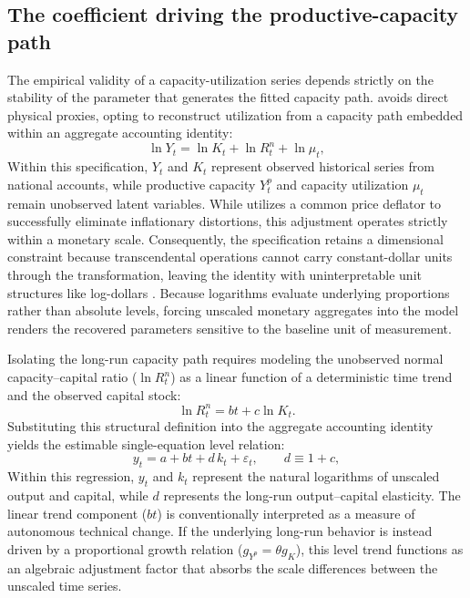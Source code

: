 \documentclass[11pt]{article}
\begin{document}
\subsection{The coefficient driving the productive-capacity path}
\label{subsec:coefficient_capacity_path}

The empirical validity of a capacity-utilization series depends strictly on the stability of the parameter that generates the fitted capacity path. \citet{Shaikh2016} avoids direct physical proxies, opting to reconstruct utilization from a capacity path embedded within an aggregate accounting identity:
\begin{equation}
\ln Y_t = \ln K_t + \ln R^n_t + \ln \mu_t,
\end{equation}
Within this specification, $Y_t$ and $K_t$ represent observed historical series from national accounts, while productive capacity $Y^p_t$ and capacity utilization $\mu_t$ remain unobserved latent variables. While \citet{Shaikh2016} utilizes a common price deflator to successfully eliminate inflationary distortions, this adjustment operates strictly within a monetary scale. Consequently, the specification retains a dimensional constraint because transcendental operations cannot carry constant-dollar units through the transformation, leaving the identity with uninterpretable unit structures like log-dollars \citep{Basu2022dimensional}. Because logarithms evaluate underlying proportions rather than absolute levels, forcing unscaled monetary aggregates into the model renders the recovered parameters sensitive to the baseline unit of measurement.

Isolating the long-run capacity path requires modeling the unobserved normal capacity--capital ratio ($\ln R^n_t$) as a linear function of a deterministic time trend and the observed capital stock:
\begin{equation}
\ln R^n_t = bt + c \ln K_t.
\end{equation}
Substituting this structural definition into the aggregate accounting identity yields the estimable single-equation level relation:
\begin{equation}
\label{eq:shaikh_regression}
y_t = a + bt + d\,k_t + \varepsilon_t,
\qquad d \equiv 1+c,
\end{equation}
Within this regression, $y_t$ and $k_t$ represent the natural logarithms of unscaled output and capital, while $d$ represents the long-run output--capital elasticity. The linear trend component ($bt$) is conventionally interpreted as a measure of autonomous technical change. If the underlying long-run behavior is instead driven by a proportional growth relation ($g_{Y^p} = \theta g_K$), this level trend functions as an algebraic adjustment factor that absorbs the scale differences between the unscaled time series.
\end{document}

